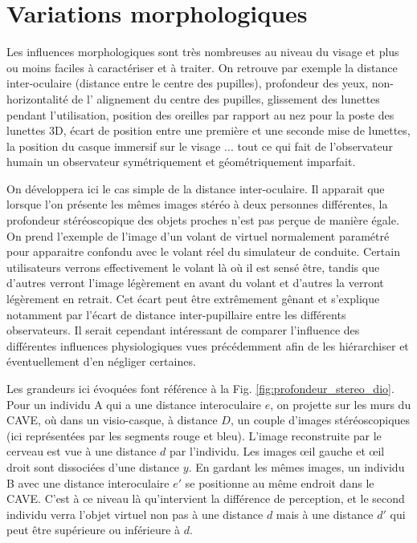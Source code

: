 	\section{Variations morphologiques}
	\par Les influences morphologiques sont très nombreuses au niveau du visage et plus ou moins faciles à caractériser et à traiter. On retrouve par exemple la distance inter-oculaire (distance entre le centre des pupilles), profondeur des yeux, non-horizontalité de l' alignement du centre des pupilles, glissement des lunettes pendant l'utilisation, position des oreilles par rapport au nez pour la poste des lunettes 3D, écart de position entre une première et une seconde mise de lunettes, la position du casque immersif sur le visage ... tout ce qui fait de l'observateur humain un observateur symétriquement et géométriquement imparfait.
	
	\par On développera ici le cas simple de la distance inter-oculaire. Il apparait que lorsque l'on présente les mêmes images stéréo à deux personnes différentes, la profondeur stéréoscopique des objets proches n'est pas perçue de manière égale. On prend l'exemple de l'image d'un volant de virtuel normalement paramétré pour apparaitre confondu avec le volant réel du simulateur de conduite. Certain utilisateurs verrons effectivement le volant là où il est sensé être, tandis que d'autres verront l'image légèrement en avant du volant et d'autres la verront légèrement en retrait. Cet écart peut être extrêmement gênant et s'explique notamment par l'écart de distance inter-pupillaire entre les différents observateurs. Il serait cependant intéressant de comparer l'influence des différentes influences physiologiques vues précédemment afin de les hiérarchiser et éventuellement d'en négliger certaines.
	
	\par Les grandeurs ici évoquées font référence à la Fig. \ref{fig:profondeur_stereo_dio}. Pour un individu A qui a une distance interoculaire $e$, on projette sur les murs du CAVE, où dans un visio-casque, à distance $D$, un couple d'images stéréoscopiques (ici représentées par les segments rouge et bleu). L'image reconstruite par le cerveau est vue à une distance $d$ par l'individu. Les images œil gauche et œil droit sont dissociées d'une distance $y$. En gardant les mêmes images, un individu B avec une distance interoculaire $e\prime$ se positionne au même endroit dans le CAVE. C'est à ce niveau là qu'intervient la différence de perception, et le second individu verra l'objet virtuel non pas à une distance $d$ mais à une distance $d\prime$ qui peut être supérieure ou inférieure à $d$.

